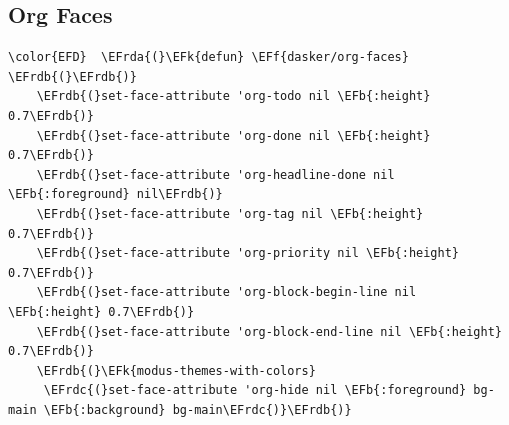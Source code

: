 \documentclass[11pt]{article}
\newcommand{\EFk}[1]{\textcolor{EFk}{#1}} %
\newcommand{\EFb}[1]{\textcolor{EFb}{#1}} %
\newcommand{\EFf}[1]{\textcolor{EFf}{#1}} %
\newcommand{\EFrda}[1]{\textcolor{EFrda}{#1}} %
\newcommand{\EFrdb}[1]{\textcolor{EFrdb}{#1}} %
\newcommand{\EFrdc}[1]{\textcolor{EFrdc}{#1}} %
\begin{document}
\subsection{Org Faces}
\label{sec:org6ce4b2b}
\begin{Code}
\begin{Verbatim}
\color{EFD}  \EFrda{(}\EFk{defun} \EFf{dasker/org-faces} \EFrdb{(}\EFrdb{)}
    \EFrdb{(}set-face-attribute 'org-todo nil \EFb{:height} 0.7\EFrdb{)}
    \EFrdb{(}set-face-attribute 'org-done nil \EFb{:height} 0.7\EFrdb{)}
    \EFrdb{(}set-face-attribute 'org-headline-done nil \EFb{:foreground} nil\EFrdb{)}
    \EFrdb{(}set-face-attribute 'org-tag nil \EFb{:height} 0.7\EFrdb{)}
    \EFrdb{(}set-face-attribute 'org-priority nil \EFb{:height} 0.7\EFrdb{)}
    \EFrdb{(}set-face-attribute 'org-block-begin-line nil \EFb{:height} 0.7\EFrdb{)}
    \EFrdb{(}set-face-attribute 'org-block-end-line nil \EFb{:height} 0.7\EFrdb{)}
    \EFrdb{(}\EFk{modus-themes-with-colors}
     \EFrdc{(}set-face-attribute 'org-hide nil \EFb{:foreground} bg-main \EFb{:background} bg-main\EFrdc{)}\EFrdb{)}


\end{Verbatim}
\end{Code}
\end{document}
